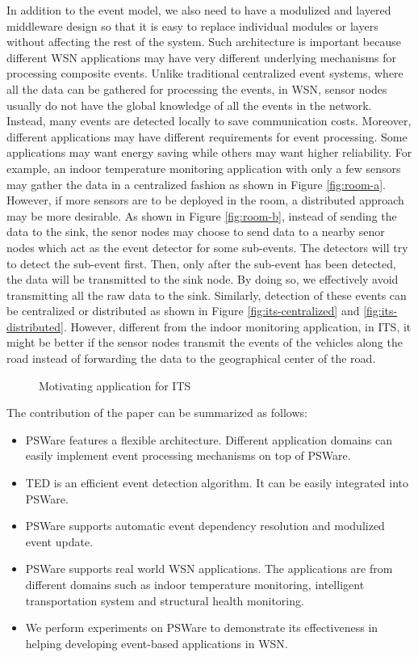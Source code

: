In addition to the event model, we also need to have a modulized and layered middleware design so that it is easy to replace individual modules or layers without affecting the rest of the system. Such architecture is important because different WSN applications may have very different underlying mechanisms for processing composite events. Unlike traditional centralized event systems, where all the data can be gathered for processing the events, in WSN, sensor nodes usually do not have the global knowledge of all the events in the network. Instead, many events are detected locally to save communication costs. Moreover, different applications may have different requirements for event processing. Some applications may want energy saving while others may want higher reliability. For example, an indoor temperature monitoring application with only a few sensors may gather the data in a centralized fashion as shown in Figure \ref{fig:room-a}. However, if more sensors are to be deployed in the room, a distributed approach may be more desirable. As shown in Figure \ref{fig:room-b}, instead of sending the data to the sink, the senor nodes may choose to send data to a nearby senor nodes which act as the event detector for some sub-events. The detectors will try to detect the sub-event first. Then, only after the sub-event has been detected, the data will be transmitted to the sink node. By doing so, we effectively avoid transmitting all the raw data to the sink. Similarly, detection of these events can be centralized or distributed as shown in Figure \ref{fig:its-centralized} and \ref{fig:its-distributed}. However, different from the indoor monitoring application, in ITS, it might be better if the sensor nodes transmit the events of the vehicles along the road instead of forwarding the data to the geographical center of the road. 

\begin{figure}
\centering
{}
\caption{Motivating application for ITS}
\label{fig:its}
\end{figure}

The contribution of the paper can be summarized as follows:
\begin{itemize}
\item PSWare features a flexible architecture. Different application domains can easily implement event processing mechanisms on top of PSWare.
\item TED is an efficient event detection algorithm. It can be easily integrated into PSWare.
\item PSWare supports automatic event dependency resolution and modulized event update.
\item PSWare supports real world WSN applications. The applications are from different domains such as indoor temperature monitoring, intelligent transportation system and structural health monitoring.
\item We perform experiments on PSWare to demonstrate its effectiveness in helping developing event-based applications in WSN.
\end{itemize}

